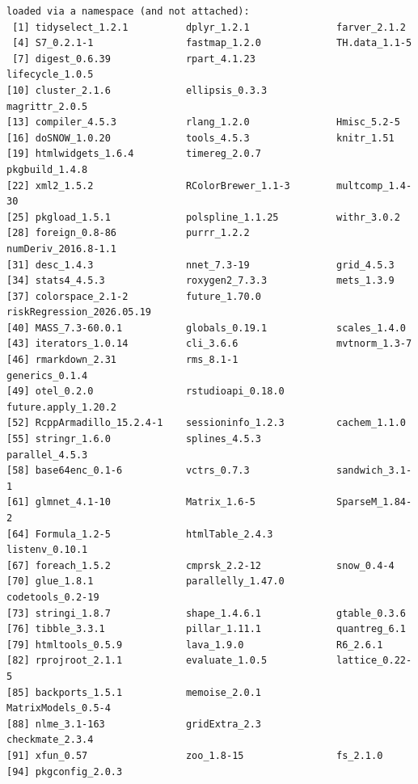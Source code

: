 \documentclass[12pt]{article}
\begin{document}
\begin{verbatim}
loaded via a namespace (and not attached):
 [1] tidyselect_1.2.1          dplyr_1.2.1               farver_2.1.2             
 [4] S7_0.2.1-1                fastmap_1.2.0             TH.data_1.1-5            
 [7] digest_0.6.39             rpart_4.1.23              lifecycle_1.0.5          
[10] cluster_2.1.6             ellipsis_0.3.3            magrittr_2.0.5           
[13] compiler_4.5.3            rlang_1.2.0               Hmisc_5.2-5              
[16] doSNOW_1.0.20             tools_4.5.3               knitr_1.51               
[19] htmlwidgets_1.6.4         timereg_2.0.7             pkgbuild_1.4.8           
[22] xml2_1.5.2                RColorBrewer_1.1-3        multcomp_1.4-30          
[25] pkgload_1.5.1             polspline_1.1.25          withr_3.0.2              
[28] foreign_0.8-86            purrr_1.2.2               numDeriv_2016.8-1.1      
[31] desc_1.4.3                nnet_7.3-19               grid_4.5.3               
[34] stats4_4.5.3              roxygen2_7.3.3            mets_1.3.9               
[37] colorspace_2.1-2          future_1.70.0             riskRegression_2026.05.19
[40] MASS_7.3-60.0.1           globals_0.19.1            scales_1.4.0             
[43] iterators_1.0.14          cli_3.6.6                 mvtnorm_1.3-7            
[46] rmarkdown_2.31            rms_8.1-1                 generics_0.1.4           
[49] otel_0.2.0                rstudioapi_0.18.0         future.apply_1.20.2      
[52] RcppArmadillo_15.2.4-1    sessioninfo_1.2.3         cachem_1.1.0             
[55] stringr_1.6.0             splines_4.5.3             parallel_4.5.3           
[58] base64enc_0.1-6           vctrs_0.7.3               sandwich_3.1-1           
[61] glmnet_4.1-10             Matrix_1.6-5              SparseM_1.84-2           
[64] Formula_1.2-5             htmlTable_2.4.3           listenv_0.10.1           
[67] foreach_1.5.2             cmprsk_2.2-12             snow_0.4-4               
[70] glue_1.8.1                parallelly_1.47.0         codetools_0.2-19         
[73] stringi_1.8.7             shape_1.4.6.1             gtable_0.3.6             
[76] tibble_3.3.1              pillar_1.11.1             quantreg_6.1             
[79] htmltools_0.5.9           lava_1.9.0                R6_2.6.1                 
[82] rprojroot_2.1.1           evaluate_1.0.5            lattice_0.22-5           
[85] backports_1.5.1           memoise_2.0.1             MatrixModels_0.5-4       
[88] nlme_3.1-163              gridExtra_2.3             checkmate_2.3.4          
[91] xfun_0.57                 zoo_1.8-15                fs_2.1.0                 
[94] pkgconfig_2.0.3
\end{verbatim}
\end{document}
